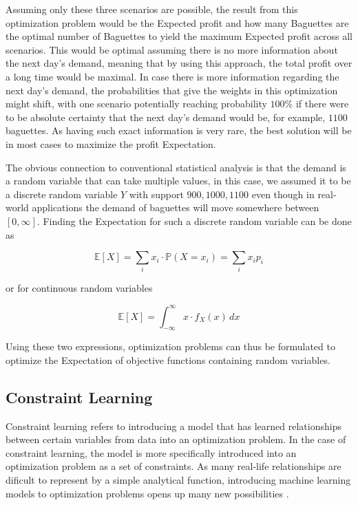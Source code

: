 \documentclass[preprint,12pt]{elsarticle}
\begin{document}
Assuming only these three scenarios are possible, the result from this optimization problem would be the Expected profit and how many Baguettes are the optimal number of Baguettes to yield the maximum Expected profit across all scenarios. This would be optimal assuming there is no more information about the next day's demand, meaning that by using this approach, the total profit over a long time would be maximal. In case there is more information regarding the next day's demand, the probabilities that give the weights in this optimization might shift, with one scenario potentially reaching probability $100\%$ if there were to be absolute certainty that the next day's demand would be, for example, $1100$ baguettes. As having such exact information is very rare, the best solution will be in most cases to maximize the profit Expectation. 

The obvious connection to conventional statistical analysis is that the demand is a random variable that can take multiple values, in this case, we assumed it to be a discrete random variable $Y$ with support ${900,1000,1100}$ even though in real-world applications the demand of baguettes will move somewhere between $[0,\infty]$. Finding the Expectation for such a discrete random variable can be done as 

\[
\mathbb{E}[X] = \sum_{i} x_i \cdot \mathbb{P}(X = x_i) = \sum_{i} x_i p_i
\]

or for continuous random variables  

\[
\mathbb{E}[X] = \int_{-\infty}^{\infty} x \cdot f_X(x) \, dx
\]

Using these two expressions, optimization problems can thus be formulated to optimize the Expectation of objective functions containing random variables. \cite{BirgeLouveauxStochasticProgramming}


\subsection{Constraint Learning} \label{sec:constraint_learning}

Constraint learning refers to introducing a model that has learned relationships between certain variables from data into an optimization problem. In the case of constraint learning, the model is more specifically introduced into an optimization problem as a set of constraints. As many real-life relationships are dificult to represent by a simple analytical function, introducing machine learning models to optimization problems opens up many new possibilities \cite{FAJEMISIN20241}.
\end{document}
